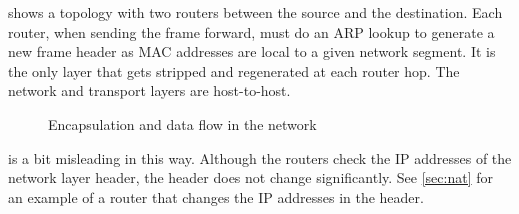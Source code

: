 { shows a topology with two routers between the source and the destination.
Each router, when sending the frame forward, must do an ARP lookup to generate a new frame header as MAC addresses are local to a given network segment.
It is the only layer that gets stripped and regenerated at each router hop.
The network and transport layers are host-to-host.


\begin{figure}
\centering

\caption{Encapsulation and data flow in the network}
\label{fig:data-flow}
\end{figure}


 is a bit misleading in this way.
Although the routers check the IP addresses of the network layer header, the header does not change significantly.
See \vref{sec:nat} for an example of a router that changes the IP addresses in the header.
}

\label{sec:network-icons}

